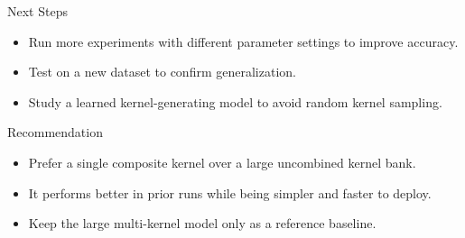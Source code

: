 \documentclass[aspectratio=169]{beamer}
\begin{document}
\begin{frame}{Next Steps}
  \begin{itemize}
    \item Run more experiments with different parameter settings to improve accuracy.
    \item Test on a new dataset to confirm generalization.
    \item Study a learned kernel-generating model to avoid random kernel sampling.
  \end{itemize}
\end{frame}

\begin{frame}{Recommendation}
  \begin{itemize}
    \item Prefer a single composite kernel over a large uncombined kernel bank.
    \item It performs better in prior runs while being simpler and faster to deploy.
    \item Keep the large multi-kernel model only as a reference baseline.
  \end{itemize}
\end{frame}
\end{document}
